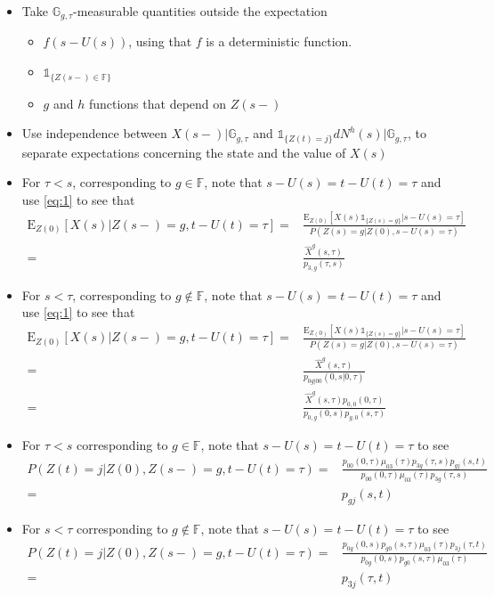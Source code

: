 \documentclass[12pt]{article}
\newcommand{\E}{\text{E}}
\newcommand{\indic}[1]{\mathds{1}_{ \{ #1 \} }}
\begin{document}
\begin{itemize}
\item Take $ \mathbb{G}_{g,\tau}$-measurable quantities outside the expectation 
\begin{itemize}
\item $f(s-U(s))$, using that $f$ is a deterministic function.
\item $\indic{Z(s-) \in \mathbb{F} }$
\item $g$ and $h$ functions that depend on $Z(s-)$
\end{itemize}
\item Use independence between $X(s-)|\mathbb{G}_{g,\tau}$ and $\indic{Z(t)=j} dN^h(s)|\mathbb{G}_{g,\tau}$, to separate expectations concerning the state and the value of $X(s)$
\item For $\tau<s$, corresponding to $g\in \mathbb{F}$, note that $s-U(s)=t-U(t)=\tau$ and use \eqref{eq:1} to see that
\begin{align*}
\E_{Z(0)} [X(s)|Z(s-)=g, t-U(t)=\tau] =& \frac{\E_{Z(0)}[X(s) \indic{Z(s)=g} | s-U(s)=\tau]}{P(Z(s)=g|Z(0),s-U(s)=\tau)}
\\
=&
\frac{\hat{X}^g(s,\tau)}{p_{3,g}(\tau,s)}
\end{align*}
\item For $s<\tau$, corresponding to $g \notin \mathbb{F}$, note that $s-U(s)=t-U(t)=\tau$ and use \eqref{eq:1} to see that
\begin{align*}
\E_{Z(0)} [X(s)|Z(s-)=g, t-U(t)=\tau] =& \frac{\E_{Z(0)}[X(s) \indic{Z(s)=g} | s-U(s)=\tau]}{P(Z(s)=g|Z(0),s-U(s)=\tau)}
\\
=&
\frac{\hat{X}^g(s,\tau)}{p_{0g|00}(0,s|0,\tau)}
\\
=&
\frac{\hat{X}^g(s,\tau) p_{0,0}(0,\tau)}{p_{0,g}(0,s)p_{g,0}(s,\tau)}
\end{align*}
\item For $\tau<s$ corresponding to $g\in \mathbb{F}$, note that $s-U(s)=t-U(t)=\tau$ to see
\begin{align*}
P( Z(t)=j|Z(0),Z(s-)=g, t-U(t)=\tau) =&\frac{p_{00}(0,\tau)\mu_{03}(\tau) p_{3g}(\tau,s)p_{gj}(s,t)}{p_{00}(0,\tau)\mu_{03}(\tau) p_{3g}(\tau,s)}
\\
=&
p_{gj}(s,t)
\end{align*}
\item For $s<\tau$ corresponding to $g\notin \mathbb{F}$, note that $s-U(s)=t-U(t)=\tau$ to see
\begin{align*}
P( Z(t)=j|Z(0),Z(s-)=g, t-U(t)=\tau) =&\frac{p_{0g}(0,s) p_{g0}(s,\tau ) \mu_{03}(\tau) p_{3j}(\tau,t)}{p_{0g}(0,s) p_{g0}(s,\tau ) \mu_{03}(\tau)}
\\
=&
p_{3j}(\tau,t)
\end{align*}
\end{itemize}
\end{document}
